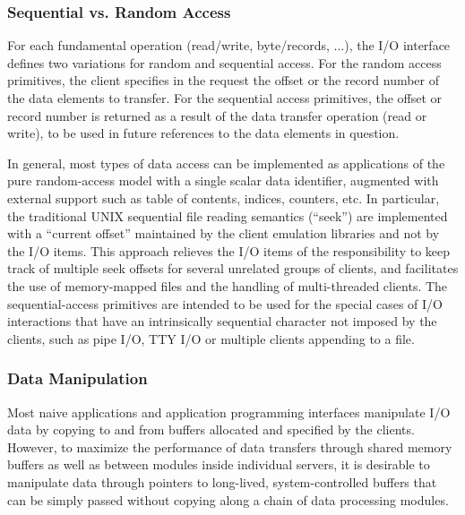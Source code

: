 \subsubsection{Sequential vs. Random Access}

For each fundamental operation (read/write, byte/records, ...), the
I/O interface defines two variations for random and sequential access.
For the random access primitives, the client specifies in the request
the offset or the record number of the data elements to transfer. For
the sequential access primitives, the offset or record number is
returned as a result of the data transfer operation (read or write),
to be used in future references to the data elements in question.

In general, most types of data access can be implemented as
applications of the pure random-access model with a single scalar data
identifier, augmented with external support such as table of contents,
indices, counters, etc. In particular, the traditional UNIX sequential
file reading semantics (``seek'') are implemented with a ``current
offset'' maintained by the client emulation libraries and not by the
I/O items. This approach relieves the I/O items of the responsibility
to keep track of multiple seek offsets for several unrelated groups of
clients, and facilitates the use of memory-mapped files and the
handling of multi-threaded clients.  The sequential-access primitives
are intended to be used for the special cases of I/O interactions that
have an intrinsically sequential character not imposed by the clients,
such as pipe I/O, TTY I/O or multiple clients appending to a file.

\subsubsection{Data Manipulation}

Most naive applications and application programming interfaces
manipulate I/O data by copying to and from buffers allocated and
specified by the clients. However, to maximize the performance of data
transfers through shared memory buffers as well as between modules
inside individual servers, it is desirable to manipulate data through
pointers to long-lived, system-controlled buffers that can be simply
passed without copying along a chain of data processing modules. 

